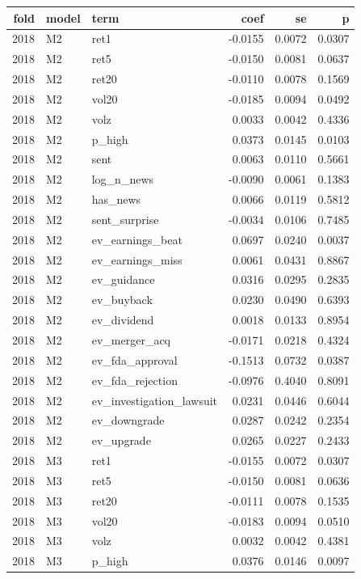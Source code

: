 \begin{tabular}{rllrrr}
\toprule
fold & model & term & coef & se & p \\
\midrule
2018 & M2 & ret1 & -0.0155 & 0.0072 & 0.0307 \\
2018 & M2 & ret5 & -0.0150 & 0.0081 & 0.0637 \\
2018 & M2 & ret20 & -0.0110 & 0.0078 & 0.1569 \\
2018 & M2 & vol20 & -0.0185 & 0.0094 & 0.0492 \\
2018 & M2 & volz & 0.0033 & 0.0042 & 0.4336 \\
2018 & M2 & p\_high & 0.0373 & 0.0145 & 0.0103 \\
2018 & M2 & sent & 0.0063 & 0.0110 & 0.5661 \\
2018 & M2 & log\_n\_news & -0.0090 & 0.0061 & 0.1383 \\
2018 & M2 & has\_news & 0.0066 & 0.0119 & 0.5812 \\
2018 & M2 & sent\_surprise & -0.0034 & 0.0106 & 0.7485 \\
2018 & M2 & ev\_earnings\_beat & 0.0697 & 0.0240 & 0.0037 \\
2018 & M2 & ev\_earnings\_miss & 0.0061 & 0.0431 & 0.8867 \\
2018 & M2 & ev\_guidance & 0.0316 & 0.0295 & 0.2835 \\
2018 & M2 & ev\_buyback & 0.0230 & 0.0490 & 0.6393 \\
2018 & M2 & ev\_dividend & 0.0018 & 0.0133 & 0.8954 \\
2018 & M2 & ev\_merger\_acq & -0.0171 & 0.0218 & 0.4324 \\
2018 & M2 & ev\_fda\_approval & -0.1513 & 0.0732 & 0.0387 \\
2018 & M2 & ev\_fda\_rejection & -0.0976 & 0.4040 & 0.8091 \\
2018 & M2 & ev\_investigation\_lawsuit & 0.0231 & 0.0446 & 0.6044 \\
2018 & M2 & ev\_downgrade & 0.0287 & 0.0242 & 0.2354 \\
2018 & M2 & ev\_upgrade & 0.0265 & 0.0227 & 0.2433 \\
2018 & M3 & ret1 & -0.0155 & 0.0072 & 0.0307 \\
2018 & M3 & ret5 & -0.0150 & 0.0081 & 0.0636 \\
2018 & M3 & ret20 & -0.0111 & 0.0078 & 0.1535 \\
2018 & M3 & vol20 & -0.0183 & 0.0094 & 0.0510 \\
2018 & M3 & volz & 0.0032 & 0.0042 & 0.4381 \\
2018 & M3 & p\_high & 0.0376 & 0.0146 & 0.0097 \\

\end{tabular}

